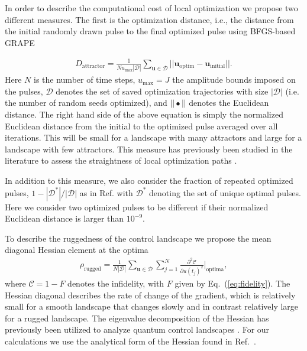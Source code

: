 \documentclass[aps, twocolumn,superscriptaddress]{revtex4-1}
\begin{document}
In order to describe the computational cost of local optimization we propose two different measures. The first is the optimization distance, i.e., the distance from the initial randomly drawn pulse to the final optimized pulse using BFGS-based GRAPE

\begin{align}
    D_{\text{attractor}} = \frac{1}{N u_{\max} |\mathcal{D}|}
    \sum_{\mathbf{u}\in \mathcal{D}}
    || 
    \mathbf{u}_{\text{optim}}-\mathbf{u}_{\text{initial}}
    ||
    . \label{eq:attractor_density}
\end{align}
Here $N$ is the number of time steps, $u_{\max} = J$ the amplitude bounds imposed on the pulses, $\mathcal{D}$ denotes the set of saved optimization trajectories with size $|\mathcal{D}|$ (i.e. the number of random seeds optimized), and $|| \bullet ||$ denotes the Euclidean distance. The right hand side of the above equation is simply the normalized Euclidean distance from the initial to the optimized pulse averaged over all iterations. This will be small for a landscape with many attractors and large for a landscape with few attractors. This measure has previously been studied in the literature to assess the straightness of local optimization paths \cite{nanduri2013exploring,Larocca_2018}. 

In addition to this measure, we also consider the fraction of repeated optimized pulses, $1-|\mathcal{D^*}|/|\mathcal{D}|$ as in Ref. \cite{day2019glassy} with $\mathcal{D}^*$ denoting the set of unique optimal pulses. Here we consider two optimized pulses to be different if their normalized Euclidean distance is larger than $10^{-9}$.  

To describe the ruggedness of the control landscape we propose the mean diagonal Hessian element at the optima
\begin{align}
    \rho_{\text{rugged}} = \frac{1}{N|\mathcal{D}|} \sum_{\mathbf{u} \in \mathcal{D}}
    \sum_{j=1}^N \frac{\partial^2 \mathcal{C}}{ \partial  u(t_j)^2}
    \bigg |_{\text{optima}},
 \end{align}
where $\mathcal{C} = 1- F$ denotes the infidelity, with $F$ given by Eq.~(\ref{eq:fidelity}). The Hessian diagonal describes the rate of change of the gradient, which is relatively small for a smooth landscape that changes slowly and in contrast relatively large for a rugged landscape. The eigenvalue decomposition of the Hessian has previously been utilized to analyze quantum control landscapes \cite{shen2006quantum, hsieh2009topology}. For our calculations we use the analytical form of the Hessian found in Ref.~\cite{dalgaard2020hessian}. 
\end{document}
